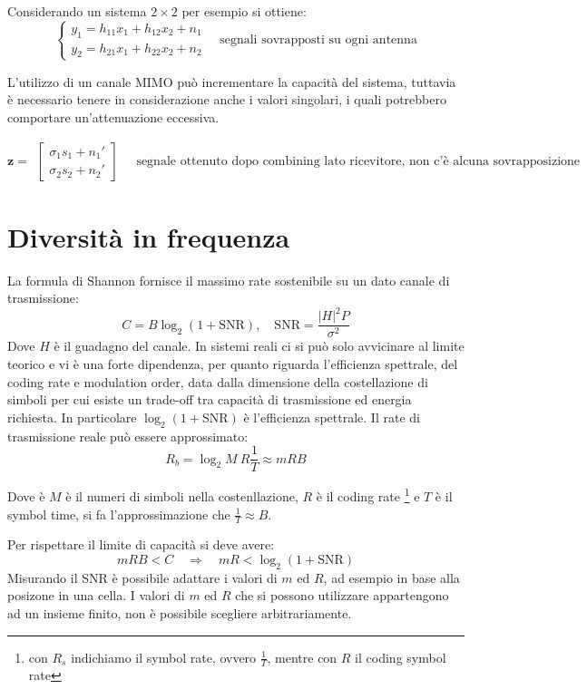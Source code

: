 Considerando un sistema $2 \times 2$ per esempio si ottiene:
\[
    \begin{cases*}
        y_1 = h_{11} x_1 + h_{12} x_2 + n_1 \\
        y_2 = h_{21} x_1 + h_{22} x_2 + n_2
    \end{cases*}
    \quad
    \text{segnali sovrapposti su ogni antenna}
\]

L'utilizzo di un canale MIMO può incrementare la capacità del sistema, tuttavia è necessario tenere in considerazione anche i valori singolari, i quali potrebbero comportare un'attenuazione eccessiva.


\[
    \mathbf{z} = \begin{matrix}
        \begin{bmatrix}
            \sigma_1 s_1 + n_1' \\
            \sigma_2 s_2 + n_2'
        \end{bmatrix}
    \end{matrix}
    \quad 
    \text{segnale ottenuto dopo combining lato ricevitore, non c'è alcuna sovrapposizione}
\]

\section*{Diversità in frequenza}

La formula di Shannon fornisce il massimo rate sostenibile su un dato canale di trasmissione:
\[
    C = B \log_2 \left( 1 + \text{SNR} \right), \quad \text{SNR} = \frac{\left| H \right|^2 P}{\sigma^2}
\]
Dove $H$ è il guadagno del canale.
In sistemi reali ci si può solo avvicinare al limite teorico e vi è una forte dipendenza, per quanto riguarda l'efficienza spettrale, del coding rate e modulation order, data dalla dimensione della costellazione di simboli per cui esiste un trade-off tra capacità di trasmissione ed energia richiesta.
In particolare $\log_2 \left( 1 + \text{SNR} \right)$ è l'efficienza spettrale.
Il rate di trasmissione reale può essere approssimato:
\[
    R_b = \log_2 M \  R \frac{1}{T}  \approx m R B
\]

Dove è $M$ è il numeri di simboli nella costenllazione, $R$ è il coding rate \footnote{con $R_s$ indichiamo il symbol rate, ovvero $\frac{1}{T}$, mentre con $R$ il coding symbol rate} e $T$ è il symbol time, si fa l'approssimazione che $\frac{1}{T} \approx B$. 


Per rispettare il limite di capacità si deve avere:
\[
    m R B < C \quad \Rightarrow \quad m R < \log_2 (1 + \text{SNR})
\]
Misurando il SNR è possibile adattare i valori di $m$ ed $R$, ad esempio in base alla posizone in una cella.
I valori di $m$ ed $R$ che si possono utilizzare appartengono ad un insieme finito, non è possibile scegliere arbitrariamente.

